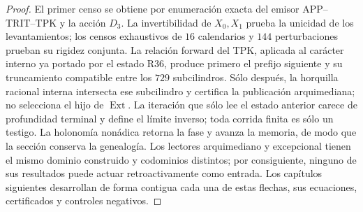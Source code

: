 \begin{proof}
El primer censo se obtiene por enumeración exacta del emisor APP--TRIT--TPK y
la acción \(D_3\). La invertibilidad de \(X_0,X_1\) prueba la unicidad de los
levantamientos; los censos exhaustivos de \(16\) calendarios y \(144\)
perturbaciones prueban su rigidez conjunta. La relación forward del TPK,
aplicada al carácter interno ya portado por el estado R36, produce primero el
prefijo siguiente y su truncamiento compatible entre los \(729\)
subcilindros. Sólo después, la horquilla racional interna intersecta ese
subcilindro y certifica la publicación arquimediana; no selecciona el hijo de
\(\operatorname{Ext}\). La iteración que sólo lee el estado anterior carece
de profundidad terminal y define el límite inverso; toda corrida finita es
sólo un testigo. La holonomía nonádica retorna la fase y avanza la memoria, de
modo que la sección conserva la genealogía. Los lectores arquimediano y
excepcional tienen el mismo dominio construido y codominios distintos; por
consiguiente, ninguno de sus resultados puede actuar retroactivamente como
entrada. Los capítulos siguientes desarrollan de forma contigua cada una de
estas flechas, sus ecuaciones, certificados y controles negativos.
\end{proof}

